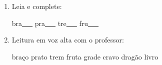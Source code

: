 \begin{exercicio}
\begin{enumerate}[resume]
\begin{enumerate}[label=(\alph*)]
    \item O som da unidade é: ( ) oral ( ) nasal ( ) vibrante

    \item A primeira sílaba de BRAÇO é: ( ) BRA ( ) BRO

    \item As palavras da unidade aparecem: ( ) no início ( ) no meio ( ) no fim das palavras

  \end{enumerate}

  \item Leia e complete:
  \begin{center}
  bra\underline{~~~} \quad pra\underline{~~~} \quad tre\underline{~~~} \quad fru\underline{~~~}
  \end{center}

  \item Leitura em voz alta com o professor:
  \begin{center}
  braço \quad prato \quad trem \quad fruta \quad grade \quad cravo \quad dragão \quad livro
  \end{center}

\end{enumerate}

\end{exercicio}



